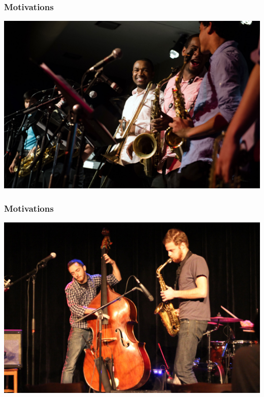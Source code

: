 \documentclass[mathserif,serif]{beamer}
\begin{document}
\begin{frame}
	\frametitle{Motivations}

	\includegraphics[width=\textwidth]{cat-jazz}
\end{frame}

\begin{frame}
	\frametitle{Motivations}

	\includegraphics[width=\textwidth]{mwsb-jazz}
\end{frame}

\end{document}
